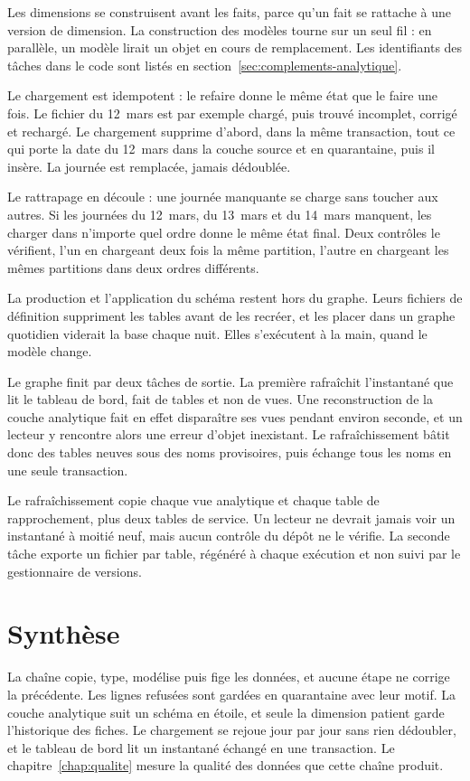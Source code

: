 Les dimensions se construisent avant les faits, parce qu'un fait se rattache à une version de
dimension. La construction des modèles tourne sur un seul fil : en parallèle, un modèle lirait un
objet en cours de remplacement. Les identifiants des tâches dans le code sont listés en
section~\ref{sec:complements-analytique}.

Le chargement est idempotent : le refaire donne le même état que le faire une fois. Le fichier du
12~mars est par exemple chargé, puis trouvé incomplet, corrigé et rechargé. Le chargement supprime
d'abord, dans la même transaction, tout ce qui porte la date du 12~mars dans la couche source et en
quarantaine, puis il insère. La journée est remplacée, jamais dédoublée.

Le rattrapage en découle : une journée manquante se charge sans toucher aux autres. Si les journées
du 12~mars, du 13~mars et du 14~mars manquent, les charger dans n'importe quel ordre donne le même
état final. Deux contrôles le vérifient, l'un en chargeant deux fois la même partition, l'autre en
chargeant les mêmes partitions dans deux ordres différents.

La production et l'application du schéma restent hors du graphe. Leurs fichiers de définition
suppriment les tables avant de les recréer, et les placer dans un graphe quotidien viderait la base
chaque nuit. Elles s'exécutent à la main, quand le modèle change.

Le graphe finit par deux tâches de sortie. La première rafraîchit l'instantané que lit le tableau
de bord, fait de tables et non de vues. Une reconstruction de la couche analytique fait en effet
disparaître ses vues pendant environ  seconde, et un lecteur y rencontre alors une
erreur d'objet inexistant. Le rafraîchissement bâtit donc des tables neuves sous des noms
provisoires, puis échange tous les noms en une seule transaction.

Le rafraîchissement copie chaque vue analytique et chaque table de rapprochement, plus deux tables
de service. Un lecteur ne devrait jamais voir un instantané à moitié neuf, mais aucun contrôle du
dépôt ne le vérifie. La seconde tâche exporte un fichier par table, régénéré à chaque exécution et
non suivi par le gestionnaire de versions.

\section*{Synthèse}

La chaîne copie, type, modélise puis fige les données, et aucune étape ne corrige la précédente.
Les lignes refusées sont gardées en quarantaine avec leur motif. La couche analytique suit un schéma
en étoile, et seule la dimension patient garde l'historique des fiches. Le chargement se rejoue jour
par jour sans rien dédoubler, et le tableau de bord lit un instantané échangé en une transaction.
Le chapitre~\ref{chap:qualite} mesure la qualité des données que cette chaîne produit.
